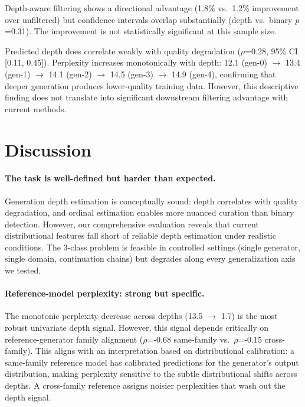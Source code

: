 \documentclass[11pt]{article}
\begin{document}
Depth-aware filtering shows a directional advantage (1.8\% vs.\ 1.2\% improvement over unfiltered) but confidence intervals overlap substantially (depth vs.\ binary $p$=0.31).
The improvement is not statistically significant at this sample size.

Predicted depth does correlate weakly with quality degradation ($\rho$=0.28, 95\% CI [0.11, 0.45]).
Perplexity increases monotonically with depth: 12.1 (gen-0) $\to$ 13.4 (gen-1) $\to$ 14.1 (gen-2) $\to$ 14.5 (gen-3) $\to$ 14.9 (gen-4), confirming that deeper generation produces lower-quality training data.
However, this descriptive finding does not translate into significant downstream filtering advantage with current methods.

\section{Discussion}
\label{sec:discussion}

\paragraph{The task is well-defined but harder than expected.}
Generation depth estimation is conceptually sound: depth correlates with quality degradation, and ordinal estimation enables more nuanced curation than binary detection.
However, our comprehensive evaluation reveals that current distributional features fall short of reliable depth estimation under realistic conditions.
The 3-class problem is feasible in controlled settings (single generator, single domain, continuation chains) but degrades along every generalization axis we tested.

\paragraph{Reference-model perplexity: strong but specific.}
The monotonic perplexity decrease across depths (13.5 $\to$ 1.7) is the most robust univariate depth signal.
However, this signal depends critically on reference-generator family alignment ($\rho$=-0.68 same-family vs.\ $\rho$=-0.15 cross-family).
This aligns with an interpretation based on distributional calibration: a same-family reference model has calibrated predictions for the generator's output distribution, making perplexity sensitive to the subtle distributional shifts across depths.
A cross-family reference assigns noisier perplexities that wash out the depth signal.
\end{document}
